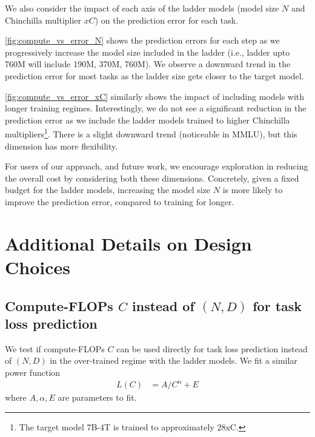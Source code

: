 We also consider the impact of each axis of the ladder models (model size $N$ and Chinchilla multiplier $xC$) on the prediction error for each task. 

\autoref{fig:compute_vs_error_N} shows the prediction errors for each step as we progressively increase the model size included in the ladder (i.e., ladder upto 760M will include 190M, 370M, 760M). We observe a downward trend in the prediction error for most tasks as the ladder size gets closer to the target model. 



\autoref{fig:compute_vs_error_xC} similarly shows the impact of including models with longer training regimes. Interestingly, we do not see a significant reduction in the prediction error as we include the ladder models trained to higher Chinchilla multipliers\footnote{The target model 7B-4T is trained to approximately 28xC.}. There is a slight downward trend (noticeable in MMLU), but this dimension has more flexibility. 

For users of our approach, and future work, we encourage exploration in reducing the overall cost by considering both these dimensions. Concretely, given a fixed budget for the ladder models, increasing the model size $N$ is more likely to improve the prediction error, compared to training for longer.



\section{Additional Details on Design Choices}
\label{app:ablations}

\subsection{Compute-FLOPs $C$ instead of $(N, D)$ for task loss prediction}
\label{app:flops_as_feature}

We test if compute-FLOPs $C$ can be used directly for task loss prediction instead of $(N, D)$ in the over-trained regime with the ladder models.
We fit a similar power function
\begin{align}
L(C) &= A / C^\alpha + E
\label{eqn:flops_fit}
\end{align}
where $A, \alpha, E$ are parameters to fit.



